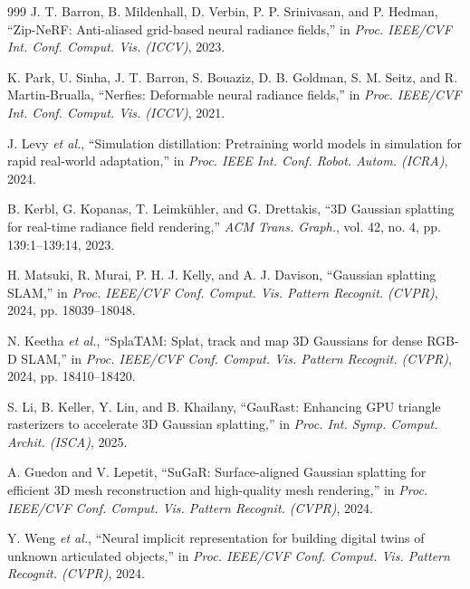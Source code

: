\documentclass[12pt,a4paper,oneside]{report}
\begin{document}
\begin{thebibliography}{999}
J. T. Barron, B. Mildenhall, D. Verbin, P. P. Srinivasan, and P. Hedman, ``Zip-NeRF: Anti-aliased grid-based neural radiance fields,'' in \textit{Proc. IEEE/CVF Int. Conf. Comput. Vis. (ICCV)}, 2023.


K. Park, U. Sinha, J. T. Barron, S. Bouaziz, D. B. Goldman, S. M. Seitz, and R. Martin-Brualla, ``Nerfies: Deformable neural radiance fields,'' in \textit{Proc. IEEE/CVF Int. Conf. Comput. Vis. (ICCV)}, 2021.

J. Levy \textit{et al.}, ``Simulation distillation: Pretraining world models in simulation for rapid real-world adaptation,'' in \textit{Proc. IEEE Int. Conf. Robot. Autom. (ICRA)}, 2024.


B. Kerbl, G. Kopanas, T. Leimk\"{u}hler, and G. Drettakis, ``{3D} Gaussian splatting for real-time radiance field rendering,'' \textit{ACM Trans. Graph.}, vol. 42, no. 4, pp. 139:1--139:14, 2023.

H. Matsuki, R. Murai, P. H. J. Kelly, and A. J. Davison, ``Gaussian splatting {SLAM},'' in \textit{Proc. IEEE/CVF Conf. Comput. Vis. Pattern Recognit. (CVPR)}, 2024, pp. 18039--18048.

N. Keetha \textit{et al.}, ``{SplaTAM}: Splat, track and map {3D} Gaussians for dense {RGB-D SLAM},'' in \textit{Proc. IEEE/CVF Conf. Comput. Vis. Pattern Recognit. (CVPR)}, 2024, pp. 18410--18420.

S. Li, B. Keller, Y. Lin, and B. Khailany, ``{GauRast}: Enhancing {GPU} triangle rasterizers to accelerate {3D} Gaussian splatting,'' in \textit{Proc. Int. Symp. Comput. Archit. (ISCA)}, 2025.

A. Guedon and V. Lepetit, ``{SuGaR}: Surface-aligned {Gaussian} splatting for efficient {3D} mesh reconstruction and high-quality mesh rendering,'' in \textit{Proc. IEEE/CVF Conf. Comput. Vis. Pattern Recognit. (CVPR)}, 2024.


Y. Weng \textit{et al.}, ``Neural implicit representation for building digital twins of unknown articulated objects,'' in \textit{Proc. IEEE/CVF Conf. Comput. Vis. Pattern Recognit. (CVPR)}, 2024.


\end{thebibliography}
\end{document}
